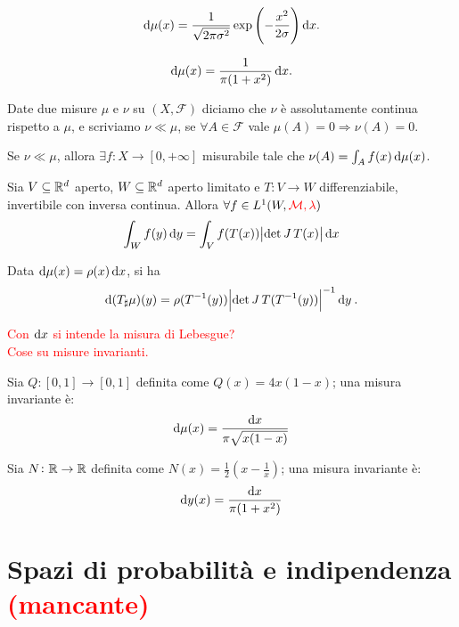 \begin{example}[Gaussiana su $ \R $]
    \[ \dif\mu(x) = \frac{1}{\sqrt{2\pi\sigma^2}} \exp{\left (-\frac{x^2}{2\sigma}\right )} \dif x. \]
\end{example}

\begin{example}
    \[ \dif\mu(x) = \frac{1}{\pi(1+x^2)}\dif x. \]
\end{example}

\begin{definition}
    Date due misure $ \mu $ e $ \nu $ su $ (X, \mathcal{F}) $ diciamo che $ \nu $ è assolutamente continua rispetto a $ \mu $, e scriviamo $ \nu \ll \mu $, se $ \forall A \in \mathcal{F} $ vale $ \mu(A) = 0 \Rightarrow \nu(A) = 0$.
\end{definition}
\begin{thm}
    Se $ \nu \ll \mu $, allora $ \exists f\colon X\to [0,+\infty] $ misurabile tale che $ \nu(A) = \int_A f(x)\dif\mu(x) $.
\end{thm}

\begin{thm}
    Sia $ V \subseteq\mathbb{R}^d $ aperto, $ W\subseteq\mathbb{R}^d $ aperto limitato e $ T\colon V \to W $ differenziabile, invertibile con inversa continua. Allora $ \forall f\in L^1(W, \textcolor{red}{\mathcal{M}, \lambda}) $
    \[ \int_W f(y)\dif y = \int_V f(T(x)) \abs{\det{\jac{T}(x)}} \dif x \]
\end{thm}
\begin{oss}
    Data $ \dif\mu(x) = \rho(x)\dif x $, si ha 
    \begin{equation}\label{eq:pushforward-misure}
    \dif{(T_\sharp\mu)(y)} = \rho(T^{-1}(y)) \abs{\det{\jac T}(T^{-1}(y))}^{-1} \dif y \: .
    \end{equation}
\end{oss}

\textcolor{red}{Con $ \dif{x} $ si intende la misura di Lebesgue?} \\

\textcolor{red}{Cose su misure invarianti.}

\begin{exercise}
    Sia $ Q\colon [0,1] \to [0,1] $ definita come $ Q(x) = 4x(1-x) $; una misura invariante è:
    \[ \dif\mu(x) = \frac{\dif x}{\pi\sqrt{x(1-x)}} \]
\end{exercise}
\begin{exercise}
    Sia $ N\colon \mathbb{R}\to\mathbb{R} $ definita come $ N(x) = \frac{1}{2} \left( x-\frac{1}{x} \right) $; una misura invariante è:
    \[ \dif y(x) = \frac{\dif x}{\pi(1+x^2)} \]
\end{exercise}

\section{Spazi di probabilità e indipendenza \textcolor{red}{(mancante)}}
